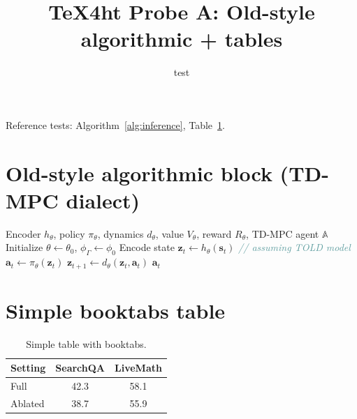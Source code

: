 \documentclass{article}
\title{TeX4ht Probe A: Old-style algorithmic + tables}
\author{test}
\begin{document}
\maketitle

Reference tests: Algorithm~\ref{alg:inference}, Table~\ref{tab:simple}.

\section{Old-style algorithmic block (TD-MPC dialect)}

\begin{algorithm}[t]
\caption{~~TD-MPC {\color{CadetBlue}(\emph{inference})}}
\label{alg:inference}
\begin{algorithmic}[1]
\REQUIRE Encoder $h_{\theta}$, policy $\pi_{\theta}$, dynamics $d_{\theta}$, value $V_{\theta}$, reward $R_{\theta}$, TD-MPC agent $\mathbb{A}$
\STATE Initialize $\theta \leftarrow \theta_{0}$, $\phi_{\Gamma} \leftarrow \phi_{0}$
    \STATE Encode state $\mathbf{z}_{t} \leftarrow h_{\theta}(\mathbf{s}_{t})$ \textcolor{CadetBlue}{\emph{// assuming TOLD model}}
        \STATE $\mathbf{a}_{t} \leftarrow \pi_{\theta}(\mathbf{z}_{t})$
        \STATE $\mathbf{z}_{t+1} \leftarrow d_{\theta}(\mathbf{z}_{t}, \mathbf{a}_{t})$
    \ENDFOR
\ENDFOR
\RETURN $\mathbf{a}_{t}$
\end{algorithmic}
\end{algorithm}

\section{Simple booktabs table}

\begin{table}[h]
\centering
\begin{tabular}{lcc}
\toprule
\textbf{Setting} & \textbf{SearchQA} & \textbf{LiveMath} \\
\midrule
Full & 42.3 & 58.1 \\
Ablated & 38.7 & 55.9 \\
\bottomrule
\end{tabular}
\caption{Simple table with booktabs.}
\label{tab:simple}
\end{table}
\end{document}
